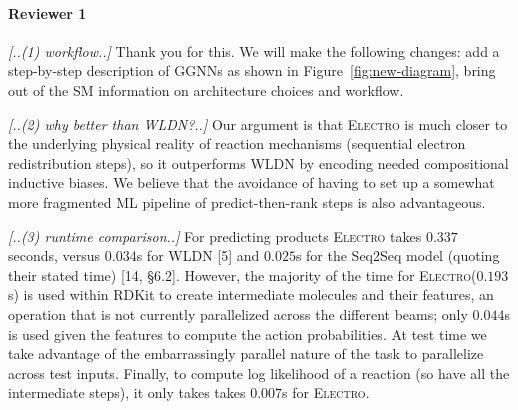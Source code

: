 \documentclass{article}
\newcommand{\ourModel}{\textsc{Electro}\xspace}
\begin{document}
\vspace{-5pt}
\paragraph{Reviewer 1}

\emph{[..(1) workflow..]}
Thank you for this. We will make the following changes: add a step-by-step description of GGNNs as shown in Figure~\ref{fig:new-diagram}, bring out of the SM information on architecture choices and workflow. 

\emph{[..(2) why better than WLDN?..]}
Our argument is that \ourModel is much closer to the underlying physical reality of reaction mechanisms (sequential electron redistribution steps), so it outperforms WLDN by encoding needed compositional inductive biases. 
We believe that the avoidance of having to set up a somewhat more fragmented ML pipeline of predict-then-rank steps is also advantageous.  %


\emph{[..(3) runtime comparison..]}
For predicting products %
\ourModel takes $0.337$ seconds, versus $0.034$s for WLDN [5] and $0.025$s %
for the Seq2Seq model (quoting their stated time) [14, \S6.2]. 
 However, the majority of the time for \ourModel ($0.193$s) is used within RDKit to create intermediate molecules and their features, an operation that is not currently parallelized across the different beams; only $0.044$s is used given the features to compute the action probabilities.
  At test time we take advantage of the embarrassingly parallel nature of the task to parallelize across test inputs. 
   Finally, to compute log likelihood of a reaction (so have all the intermediate steps), it only takes takes $0.007$s for \ourModel. %
\end{document}
